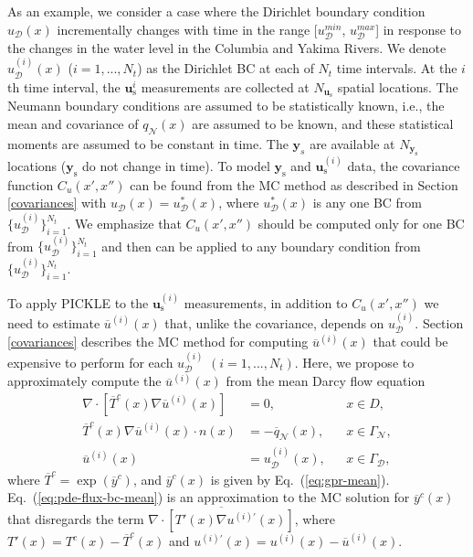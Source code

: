 \documentclass{agujournal2019}
\begin{document}
As an example, we consider a case where the Dirichlet boundary condition $u_\mathcal{D}(x)$ incrementally changes with time in the range [$u_\mathcal{D}^{min}$, $u_\mathcal{D}^{max}$] in response to the  changes in the water level in the Columbia and Yakima Rivers.
We denote  $u_\mathcal{D}^{(i)}(x)$ ($i=1,...,N_t$) as the Dirichlet BC at each of $N_{t}$ time intervals.
At the $i$th time interval, the $\mathbf{u}_\mathrm{s}^{i}$ measurements are collected at $N_{\mathbf{u}_{\mathrm{s}}}$ spatial locations.
The Neumann boundary conditions are assumed to be statistically known, i.e., the mean and covariance of $q_\mathcal{N}(x)$ are assumed to be known, and these statistical moments are assumed to be constant in time.
The $\mathbf{y}_s$ are available at $N_{\mathbf{y}_{\mathrm{s}}}$ locations ($\mathbf{y}_\mathrm{s}$ do not change in time).
To model $\mathbf{y}_\mathrm{s}$ and $\mathbf{u}_\mathrm{s}^{(i)}$ data, the covariance function $C_u(x',x'')$ can be found from the MC method as described in Section \ref{covariances} with $u_\mathcal{D}(x) = u_\mathcal{D}^*(x)$, where $u_\mathcal{D}^*(x)$ is any one BC from $\{ {u}_{\mathcal{D}}^{(i)} \}_{i=1}^{N_{t}}$.
We emphasize that $C_u(x',x'')$ should be computed only for one BC from $\{ {u}_\mathcal{D}^{(i)} \}_{i=1}^{N_{t}}$ and then can be applied to any boundary condition from $\{ {u}_\mathcal{D}^{(i)} \}_{i=1}^{N_{t}}$. 

To apply PICKLE to the $\mathbf{u}_\mathrm{s}^{(i)}$ measurements, in addition to $C_u(x',x'')$ we need to estimate  $\overline u^{(i)}(x)$ that, unlike the covariance, depends on $u_\mathcal{D}^{(i)}$.
Section \ref{covariances} describes the MC method for computing $\overline u^{(i)}(x)$ that could be expensive to perform for each ${u}_\mathcal{D}^{(i)}$ $(i=1,...,N_t)$.
Here, we propose to approximately compute the $\overline u^{(i)}(x)$ from the mean Darcy flow equation
%
\begin{align}
  \label{eq:pde-mean}
  \nabla \cdot \left [ \overline{T}^c(x) \nabla \overline u^{(i)}(x) \right ] & = 0, && x \in D,\\
  \label{eq:pde-flux-bc-mean}
  \overline{T}^c(x) \nabla \overline u^{(i)}(x) \cdot n(x) &= -\overline{q}_\mathcal{N}(x), && x \in \Gamma_\mathcal{N},\\
  \label{eq:pde-head-bc-mean}
  \overline{u}^{(i)}(x) &= u_\mathcal{D}^{(i)}(x), && x \in \Gamma_\mathcal{D},
\end{align}
%
where $\overline{T}^c = \exp (\overline{y}^c)$, and $\overline{y}^c(x)$ is given by Eq.~(\ref{eq:gpr-mean}).
Eq.~(\ref{eq:pde-flux-bc-mean}) is an approximation to the MC solution for $\overline{y}^c(x)$ that disregards the term $\overline{\nabla \cdot \left [ T'(x) \nabla  u^{(i)'}(x) \right ]}$, where $T'(x) = T^c(x)-\overline{T}^c(x)$ and $u^{(i)'}(x) = u^{(i)}(x) - \overline{u}^{(i)}(x)$.  
\end{document}
